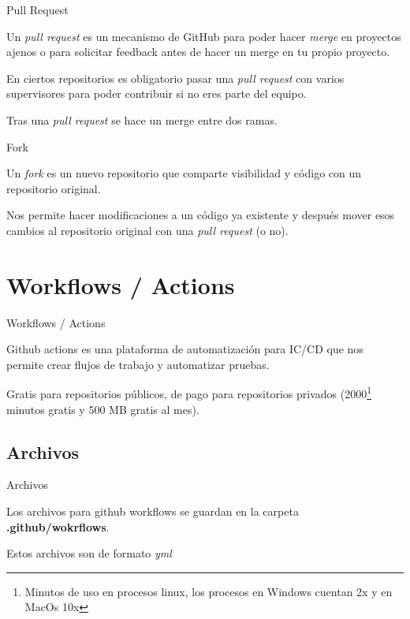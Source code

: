 \documentclass{beamer}
\begin{document}
\begin{frame}{Pull Request}

    Un \textit{pull request} es un mecanismo de GitHub para poder hacer \textit{merge} en proyectos ajenos o para solicitar feedback antes de hacer un merge en tu propio proyecto.

    En ciertos repositorios es obligatorio pasar una \textit{pull request} con varios supervisores para poder contribuir si no eres parte del equipo.

    Tras una \textit{pull request} se hace un merge entre dos ramas.
\end{frame}

\begin{frame}{Fork}

    Un \textit{fork} es un nuevo repositorio que comparte visibilidad y código con un repositorio original.

    Nos permite hacer modificaciones a un código ya existente y después mover esos cambios al repositorio original con una \textit{pull request} (o no).

\end{frame}

\section{Workflows / Actions}
\begin{frame}{Workflows / Actions}

    Github actions es una plataforma de automatización para IC/CD que nos permite crear flujos de trabajo y automatizar pruebas.

    Gratis para repositorios públicos, de pago para repositorios privados (2000\footnote[1]{Minutos de uso en procesos linux, los procesos en Windows cuentan 2x y en MacOs 10x} minutos gratis y 500 MB gratis al mes).


\end{frame}
\subsection{Archivos}
\begin{frame}{Archivos}

    Los archivos para github workflows se guardan en la carpeta \textbf{.github/wokrflows}.

    Estos archivos son de formato \textit{yml}

\end{frame}
\end{document}
